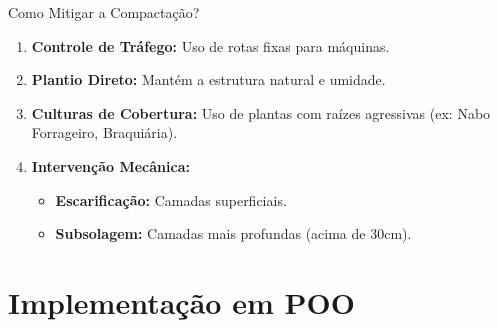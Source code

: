 \documentclass[9pt]{beamer}
\begin{document}
\begin{frame}{Como Mitigar a Compactação?}
    \begin{enumerate}
        \item \textbf{Controle de Tráfego:} Uso de rotas fixas para máquinas.
        \item \textbf{Plantio Direto:} Mantém a estrutura natural e umidade.
        \item \textbf{Culturas de Cobertura:} Uso de plantas com raízes agressivas (ex: Nabo Forrageiro, Braquiária).
        \item \textbf{Intervenção Mecânica:}
        \begin{itemize}
            \item \textbf{Escarificação:} Camadas superficiais.
            \item \textbf{Subsolagem:} Camadas mais profundas (acima de 30cm).
        \end{itemize}
    \end{enumerate}
    \centering
\end{frame}

\section{Implementação em POO}
\end{document}
